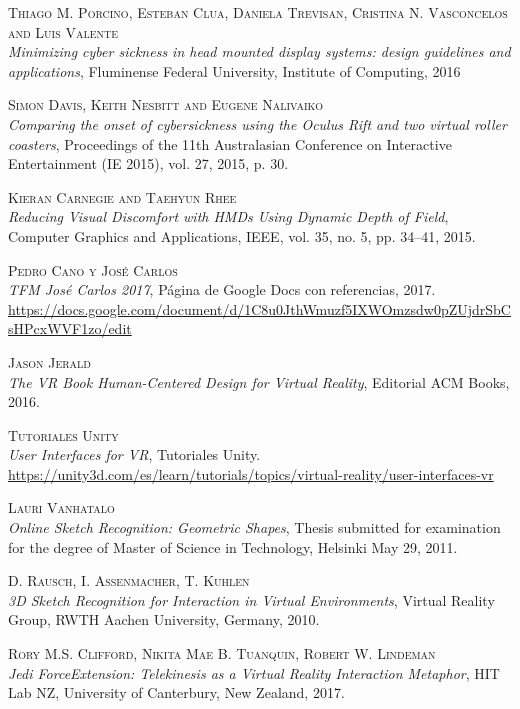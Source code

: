 \documentclass[12pt,a4paper]{article}
\begin{document}
\begin{thebibliography}{X}

\textsc{Thiago M. Porcino, Esteban Clua, Daniela Trevisan, Cristina N. Vasconcelos and Luis Valente}\\
\textit{Minimizing cyber sickness in head mounted display systems: design guidelines and applications}, Fluminense Federal University, Institute of Computing, 2016

\textsc{Simon Davis, Keith Nesbitt and Eugene Nalivaiko}\\
\textit{Comparing the onset of cybersickness using the Oculus Rift and two virtual roller coasters}, Proceedings of the 11th Australasian Conference on Interactive Entertainment (IE 2015), vol. 27, 2015, p. 30.

\textsc{Kieran Carnegie and Taehyun Rhee}\\
\textit{Reducing Visual Discomfort with HMDs Using Dynamic Depth of Field}, Computer Graphics and Applications, IEEE, vol. 35, no. 5, pp. 34–41, 2015.

\textsc{Pedro Cano y José Carlos}\\
\textit{TFM José Carlos 2017}, Página de Google Docs con referencias, 2017.\\
\url{https://docs.google.com/document/d/1C8u0JthWmuzf5IXWOmzsdw0pZUjdrSbCsHPcxWVF1zo/edit}

\textsc{Jason Jerald}\\
\textit{The VR Book Human-Centered Design for Virtual Reality}, Editorial ACM Books, 2016.

\textsc{Tutoriales Unity}\\
\textit{User Interfaces for VR}, Tutoriales Unity.\\
\url{https://unity3d.com/es/learn/tutorials/topics/virtual-reality/user-interfaces-vr}

\textsc{Lauri Vanhatalo}\\
\textit{Online Sketch Recognition: Geometric Shapes}, Thesis submitted for examination for the degree of Master of Science in Technology, Helsinki May 29, 2011.

\textsc{D. Rausch, I. Assenmacher, T. Kuhlen}\\
\textit{3D Sketch Recognition for Interaction in Virtual Environments}, Virtual Reality Group, RWTH Aachen University, Germany, 2010.

\textsc{Rory M.S. Clifford, Nikita Mae B. Tuanquin, Robert W. Lindeman}\\
\textit{Jedi ForceExtension: Telekinesis as a Virtual Reality Interaction Metaphor}, HIT Lab NZ, University of Canterbury, New Zealand, 2017.

\end{thebibliography}
\end{document}
